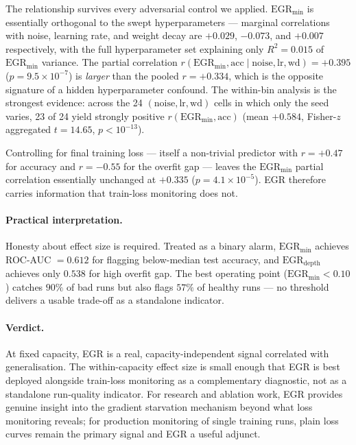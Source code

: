 The relationship survives every adversarial control we applied.
$\mathrm{EGR}_{\min}$ is essentially orthogonal to the swept
hyperparameters --- marginal correlations with noise, learning rate,
and weight decay are $+0.029$, $-0.073$, and $+0.007$ respectively,
with the full hyperparameter set explaining only $R^{2} = 0.015$ of
$\mathrm{EGR}_{\min}$ variance. The partial correlation
$r(\mathrm{EGR}_{\min}, \mathrm{acc} \mid \mathrm{noise}, \mathrm{lr},
\mathrm{wd}) = +0.395$ ($p = 9.5\times 10^{-7}$) is \emph{larger} than
the pooled $r = +0.334$, which is the opposite signature of a hidden
hyperparameter confound. The within-bin analysis is the strongest
evidence: across the 24 $(\mathrm{noise}, \mathrm{lr}, \mathrm{wd})$
cells in which only the seed varies, 23 of 24 yield strongly positive
$r(\mathrm{EGR}_{\min}, \mathrm{acc})$ (mean $+0.584$, Fisher-$z$
aggregated $t = 14.65$, $p < 10^{-13}$).

Controlling for final training loss --- itself a non-trivial predictor
with $r = +0.47$ for accuracy and $r = -0.55$ for the overfit gap ---
leaves the $\mathrm{EGR}_{\min}$ partial correlation essentially
unchanged at $+0.335$ ($p = 4.1\times 10^{-5}$). EGR therefore carries
information that train-loss monitoring does not.

\paragraph{Practical interpretation.}
Honesty about effect size is required. Treated as a binary alarm,
$\mathrm{EGR}_{\min}$ achieves ROC-AUC $= 0.612$ for flagging
below-median test accuracy, and $\mathrm{EGR}_{\mathrm{depth}}$
achieves only $0.538$ for high overfit gap. The best operating point
($\mathrm{EGR}_{\min} < 0.10$) catches $90\%$ of bad runs but also
flags $57\%$ of healthy runs --- no threshold delivers a usable
trade-off as a standalone indicator.

\paragraph{Verdict.}
At fixed capacity, EGR is a real, capacity-independent signal
correlated with generalisation. The within-capacity effect size is
small enough that EGR is best deployed alongside train-loss monitoring
as a complementary diagnostic, not as a standalone run-quality
indicator. For research and ablation work, EGR provides genuine
insight into the gradient starvation mechanism beyond what loss
monitoring reveals; for production monitoring of single training
runs, plain loss curves remain the primary signal and EGR a useful
adjunct.

